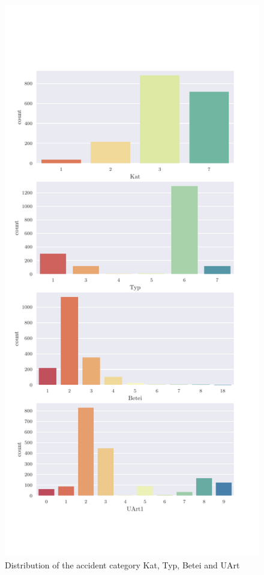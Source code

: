     \begin{figure}[ht!]
        \centering
        \includegraphics[scale=0.7]{CorrAnalysis/data/BAYSIS/02_matched/plots/baysis_matched_count_multiple01}
        \caption{Distribution of the accident category Kat, Typ, Betei and UArt}
        \label{img:baysis_matched_Kat}
        \label{img:baysis_matched_Typ}
        \label{img:baysis_matched_Betei}
        \label{img:baysis_matched_UArt}
    \end{figure}

